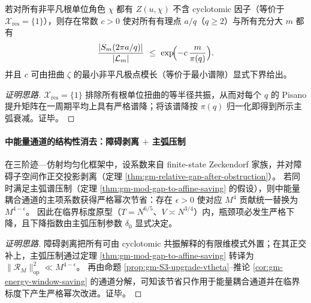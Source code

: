 \begin{proposition}[主弧谱压制的 \texorpdfstring{$\zeta$}{zeta}-判别：无 cyclotomic 因子 \texorpdfstring{$\Rightarrow$}{=>} 统一主弧衰减]\label{prop:gm-zeta-criterion-major-arc}
若对所有非平凡根单位角色 \(\chi\) 都有 \(Z(u,\chi)\) 不含 cyclotomic 因子（等价于 \(\mathcal{X}_{\mathrm{res}}=\{1\}\)），则存在常数 \(c>0\) 使对所有有理点 \(a/q\)（\(q\ge 2\)）与所有充分大 \(m\) 都有
\[
\frac{|S_m(2\pi a/q)|}{|\mathcal{L}_m|}\ \le\ \exp\!\Bigl(-c\,\frac{m}{\pi(q)}\Bigr).
\]
并且 \(c\) 可由扭曲 \(\zeta\) 的最小非平凡极点模长（等价于最小谱隙）显式下界给出。
\end{proposition}

\begin{proof}[证明思路]
\(\mathcal{X}_{\mathrm{res}}=\{1\}\) 排除所有根单位扭曲的等半径共振，从而对每个 \(q\) 的 Pisano 提升矩阵在一周期平均上具有严格谱降；将该谱降按 \(\pi(q)\) 归一化即得到所示主弧衰减。证毕。
\end{proof}

\paragraph{中能量通道的结构性消去：障碍剥离 \texorpdfstring{$+$}{+} 主弧压制}
\begin{theorem}\label{thm:gm-mid-energy-elimination}
在三阶迹—仿射均匀化框架中，设系数来自 finite-state Zeckendorf 家族，并对障碍子空间作正交投影剥离（定理 \ref{thm:gm-relative-gap-after-obstruction}）。
若同时满足主弧谱压制（定理 \ref{thm:gm-mod-gap-to-affine-saving} 的假设），则中能量耦合通道的主项系数获得严格幂次节省：存在 \(\epsilon>0\) 使对应 \(M^4\) 贡献统一替换为 \(M^{4-\epsilon}\)。
因此在临界标度原型（\(T=N^{6/5}\)、\(V\asymp N^{3/4}\)）内，瓶颈项必发生严格下降，且下降指数由主弧压制参数 \(\delta_0\) 显式决定。
\end{theorem}

\begin{proof}[证明思路]
障碍剥离把所有可由 cyclotomic 共振解释的有限维模式外置；在其正交补上，主弧压制通过定理 \ref{thm:gm-mod-gap-to-affine-saving} 转译为 \(\|\mathcal{R}_M\|_{\mathrm{op}}^2\ll M^{4-\epsilon}\)。
再由命题 \ref{prop:gm-S3-upgrade-vtheta}--推论 \ref{cor:gm-energy-window-saving} 的通道分解，可知该节省只作用于能量耦合通道并在临界标度下产生严格幂次改进。证毕。
\end{proof}

